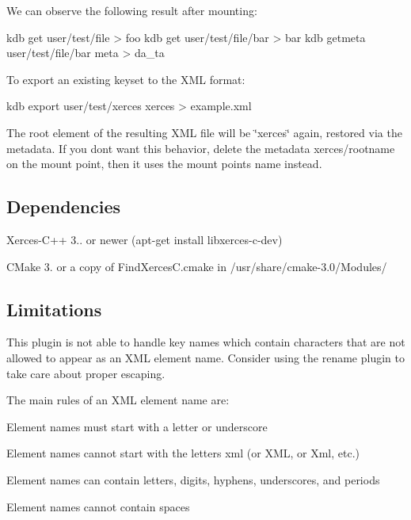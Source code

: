 We can observe the following result after mounting\+: \begin{DoxyVerb}    kdb get user/test/file > foo
    kdb get user/test/file/bar > bar
    kdb getmeta user/test/file/bar meta > da_ta
\end{DoxyVerb}


To export an existing keyset to the X\+ML format\+: \begin{DoxyVerb}    kdb export user/test/xerces xerces > example.xml
\end{DoxyVerb}


The root element of the resulting X\+ML file will be \char`\"{}xerces\char`\"{} again, restored via the metadata. If you don\textquotesingle{}t want this behavior, delete the metadata {\ttfamily xerces/rootname} on the mount point, then it uses the mount point\textquotesingle{}s name instead.

\subsection*{Dependencies}


\begin{DoxyItemize}
\item {\ttfamily Xerces-\/\+C++ 3..} or newer ({\ttfamily apt-\/get install libxerces-\/c-\/dev})
\item C\+Make 3. or a copy of {\ttfamily Find\+Xerces\+C.\+cmake} in {\ttfamily /usr/share/cmake-\/3.0/\+Modules/}
\end{DoxyItemize}

\subsection*{Limitations}

This plugin is not able to handle key names which contain characters that are not allowed to appear as an X\+ML element name. Consider using the rename plugin to take care about proper escaping.

The main rules of an X\+ML element name are\+:
\begin{DoxyItemize}
\item Element names must start with a letter or underscore
\item Element names cannot start with the letters xml (or X\+ML, or Xml, etc.)
\item Element names can contain letters, digits, hyphens, underscores, and periods
\item Element names cannot contain spaces
\end{DoxyItemize}

